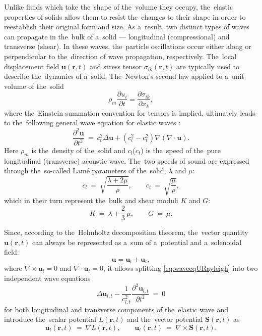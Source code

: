 Unlike fluids which take the~shape of the~volume they occupy, the~elastic properties of solids allow them to resist the~changes to their shape in order to reestablish their original form and size.
As a~result, two distinct types of waves can propagate in the~bulk of a~solid --- longitudinal (compressional) and transverse (shear).
In these waves, the~particle oscillations occur either along or perpendicular to the~direction of wave propagation, respectively.
The~local displacement field $\mathbf{u}(\mathbf{r},t)$ and stress tensor $\sigma_{ik}(\mathbf{r}, t)$ are typically used to describe the~dynamics of a~solid.
The~Newton's second law applied to a~unit volume of the~solid
\begin{equation}
\rho_m\frac{\partial u_i}{\partial t} = \frac{\partial \sigma_{ik}}{\partial x_k},
\end{equation}
where the~Einstein summation convention for tensors is implied, ultimately leads to the~following general wave equation for elastic waves \cite{LLtom7}:
\begin{equation}
\label{eq:waveeqURayleigh}
\frac{\partial^2 \mathbf{u}}{\partial t^2}~=~c_t^2 \Delta\mathbf{u} + \left(c_l^2-c_t^2\right)\nabla\left(\nabla\cdot\mathbf{u}\right).
\end{equation}
Here $\rho_m$ is the~density of the~solid and $c_l$($c_t$) is the~speed of the~pure longitudinal (transverse) acoustic wave.
The~two speeds of sound are expressed through the~so-called Lam\'e parameters of the~solid, $\lambda$ and $\mu$:
\begin{equation}
c_l~=~\sqrt{\frac{\lambda+2\mu}{\rho}}, \qquad c_t~=~\sqrt{\frac{\mu}{\rho}},
\end{equation}
which in their turn represent the~bulk and shear moduli $K$ and $G$:
\begin{equation}
K~=~\lambda+\frac23\,\mu, \qquad G~=~\mu.
\end{equation}

Since, according to the~Helmholtz decomposition theorem, the~vector quantity $\mathbf{u}(\mathbf{r},t)$ can always be represented as a~sum of a~potential and a~solenoidal field:
\begin{equation}
\mathbf{u} = \mathbf{u}_l + \mathbf{u}_t,
\end{equation}
where $\nabla\times\mathbf{u}_l = 0$ and $\nabla\cdot\mathbf{u}_t = 0$, it allows splitting \cref{eq:waveeqURayleigh} into two independent wave equations
\begin{equation}
\label{eq:waveeqUltRayleigh}
\Delta\mathbf{u}_{l,t} - \frac{1}{c_{l,t}^2}\frac{\partial^2 \mathbf{u}_{l,t}}{\partial t^2}~=~0
\end{equation}
for both longitudinal and transverse components of the~elastic wave and introduce the~scalar potential $L(\mathbf{r}, t)$ and the~vector potential $\mathbf{S}(\mathbf{r}, t)$ as
\begin{equation}
\mathbf{u}_l(\mathbf{r}, t)~=~\nabla L(\mathbf{r}, t), \qquad \mathbf{u}_t(\mathbf{r}, t)~=~\nabla\times\mathbf{S}(\mathbf{r}, t).
\end{equation}

